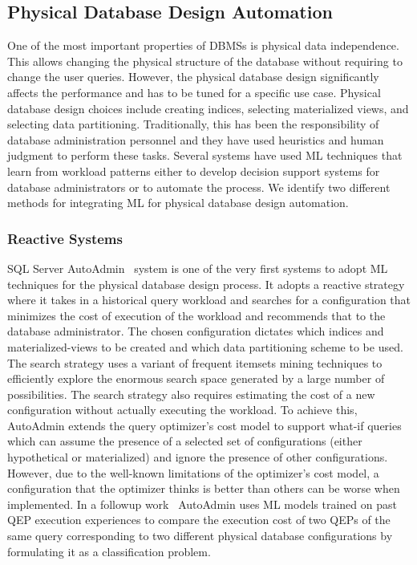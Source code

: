 \subsection{Physical Database Design Automation}
One of the most important properties of  DBMSs is physical data independence.
This allows changing the physical structure of the database without requiring to change the user queries.
However, the physical database design significantly affects the performance and has to be tuned for a specific use case.
Physical database design choices include creating indices, selecting materialized views, and selecting data partitioning.
Traditionally, this has been the responsibility of database administration personnel and they have used heuristics and human judgment to perform these tasks.
Several systems have used ML techniques that learn from workload patterns either to develop decision support systems for database administrators or to automate the process.
We identify two different methods for integrating ML for physical database design automation.

\subsubsection{Reactive Systems}
SQL Server AutoAdmin~\cite{autoadmin} system is one of the very first systems to adopt ML techniques for the physical database design process.
It adopts a reactive strategy where it takes in a historical query workload and searches for a configuration that minimizes the cost of execution of the workload and recommends that to the database administrator.
The chosen configuration dictates which indices and materialized-views to be created and which data partitioning scheme to be used.
The search strategy uses a variant of frequent itemsets mining techniques to efficiently explore the enormous search space generated by a large number of possibilities.
The search strategy also requires estimating the cost of a new configuration without actually executing the workload.
To achieve this, AutoAdmin extends the query optimizer's cost model to support what-if queries which can assume the presence of a selected set of configurations (either hypothetical or materialized) and ignore the presence of other configurations.
However, due to the well-known limitations of the optimizer's cost model, a configuration that the optimizer thinks is better than others can be worse when implemented.
In a followup work~\cite{autoadmin_2} AutoAdmin uses ML models trained on past QEP execution experiences to compare the execution cost of two QEPs of the same query corresponding to two different physical database configurations by formulating it as a classification problem.

